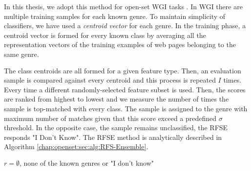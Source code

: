 In this thesis, we adopt this method for open-set WGI tasks \parencite{pritsos2013open}. In WGI there are multiple training samples for each known genre. To maintain simplicity of classifiers, we have used a \textit{centroid vector} for each genre. In the training phase, a centroid vector is formed for every known class by averaging all the representation vectors of the training examples of web pages belonging to the same genre.

The class centroids are all formed for a given feature type. Then, an evaluation sample is compared against every centroid and this process is repeated $I$ times. Every time a different randomly-selected feature subset is used. Then, the scores are ranked from highest to lowest and we measure the number of times the sample is top-matched with every class. The sample is assigned to the genre with maximum number of matches given that this score exceed a predefined $\sigma$ threshold. In the opposite case, the sample remains unclassified, the RFSE responds "I Don't Know". The RFSE method is analytically described in Algorithm \ref{chap:openset:sec:alg:RFS-Ensemble}. 

\begin{algorithm}[t]
\caption{The \textit{RFSE} algorithm.}\label{chap:openset:sec:alg:RFS-Ensemble}

{
      $r = \emptyset$, none of the known genres or "I don't know"\;
}
\end{algorithm}

